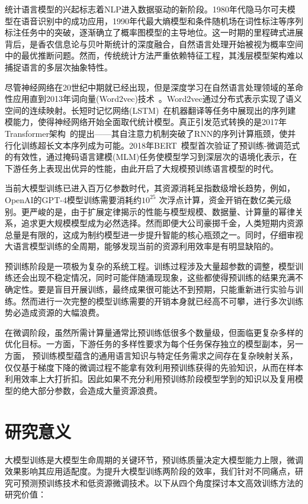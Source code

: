 统计语言模型的兴起标志着NLP进入数据驱动的新阶段。1980年代隐马尔可夫模型在语音识别中的成功应用，1990年代最大熵模型和条件随机场在词性标注等序列标注任务中的突破，逐渐确立了概率图模型的主导地位。这一时期的里程碑式进展背后，是香农信息论与贝叶斯统计的深度融合，自然语言处理开始被视为概率空间中的最优推断问题。然而，传统统计方法严重依赖特征工程，其浅层模型架构难以捕捉语言的多层次抽象特性。

尽管神经网络在20世纪中期就已经出现，但是深度学习在自然语言处理领域的革命性应用直到2013年词向量(Word2vec)技术~\cite{mikolov2013efficient}。Word2vec通过分布式表示实现了语义空间的连续映射。长短时记忆网络(LSTM)~\cite{hochreiter1997long}在机器翻译等任务中展现出的序列建模能力，使得神经网络开始全面取代统计模型。真正引发范式转换的是2017年Transformer架构~\cite{Vaswani+2017}的提出——其自注意力机制突破了RNN的序列计算瓶颈，使并行化训练超长文本序列成为可能。2018年BERT~\cite{devlin2018bert}模型首次验证了预训练-微调范式的有效性，通过掩码语言建模(MLM)任务使模型学习到深层次的语境化表示，在下游任务上表现出优异的性能，由此开启了大规模预训练语言模型的时代。

当前大模型训练已进入百万亿参数时代，其资源消耗呈指数级增长趋势，例如，OpenAI的GPT-4模型训练需要消耗约$10^{25}$ 次浮点计算，资金开销在数亿美元级别。更严峻的是，由于扩展定律揭示的性能与模型规模、数据量、计算量的幂律关系，追求更大规模模型成为必然选择。然而即便大公司豪掷千金，人类短期内资源总量是有限的，这成为制约模型进一步提升智能的核心瓶颈之一。同时，仔细审视大语言模型训练的全周期，能够发现当前的资源利用效率是有明显缺陷的。

预训练阶段是一项极为复杂的系统工程。训练过程涉及大量超参数的调整，模型训练还会出现不稳定情况，同时可能伴随涌现现象，这些都使得预训练的结果充满不确定性。要是盲目开展训练，最终成果很可能达不到预期，只能重新进行实验与训练。然而进行一次完整的模型训练需要的开销本身就已经高不可攀，进行多次训练势必造成资源的大幅浪费。

在微调阶段，虽然所需计算量通常比预训练低很多个数量级，但面临更复杂多样的优化目标。一方面，下游任务的多样性要求为每个任务保存独立的模型副本，另一方面， 预训练模型蕴含的通用语言知识与特定任务需求之间存在复杂映射关系，仅仅基于梯度下降的微调过程不能拿有效利用预训练获得的先验知识，从而在样本利用效率上大打折扣。因此如果不充分利用预训练阶段模型学到的知识以及复用模型的绝大部分参数，会造成大量资源浪费。



\section{研究意义}
大模型训练是大模型生命周期的关键环节，预训练质量决定大模型能力上限，微调效果影响其应用适配度。为提升大模型训练两阶段的效率，我们针对不同痛点，研究可预测预训练技术和低资源微调技术。以下从四个角度探讨本文高效训练方法的研究价值：

